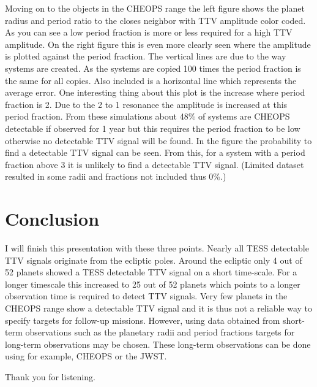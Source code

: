 \documentclass[12pt]{report}
\begin{document}
	Moving on to the objects in the CHEOPS range the left figure shows the planet radius and period ratio to the closes neighbor with TTV amplitude color coded. As you can see a low period fraction is more or less required for a high TTV amplitude. On the right figure this is even more clearly seen where the amplitude is plotted against the period fraction. The vertical lines are due to the way systems are created. As the systems are copied 100 times the period fraction is the same for all copies. Also included is a horizontal line which represents the average error. One interesting thing about this plot is the increase where period fraction is 2. Due to the 2 to 1 resonance the amplitude is increased at this period fraction.
	From these simulations about 48\% of systems are CHEOPS detectable if observed for 1 year but this requires the period fraction to be low otherwise no detectable TTV signal will be found. In the figure the probability to find a detectable TTV signal can be seen. From this, for a system with a period fraction above 3 it is unlikely to find a detectable TTV signal. (Limited dataset resulted in some radii and fractions not included thus 0\%.)
	
\section*{Conclusion}
	I will finish this presentation with these three points. Nearly all TESS detectable TTV signals originate from the ecliptic poles. Around the ecliptic only 4 out of 52 planets showed a TESS detectable TTV signal on a short time-scale. For a longer timescale this increased to 25 out of 52 planets which points to a longer observation time is required to detect TTV signals. Very few planets in the CHEOPS range show a detectable TTV signal and it is thus not a reliable way to specify targets for follow-up missions. However, using data obtained from short-term observations such as the planetary radii and period fractions targets for long-term observations may be chosen. These long-term observations can be done using for example, CHEOPS or the JWST.
	
	Thank you for listening.
	

\pagebreak
\end{document}
